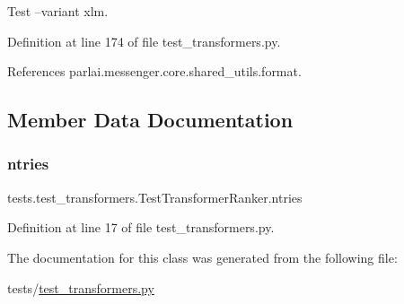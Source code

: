 \begin{DoxyVerb}Test --variant xlm.\end{DoxyVerb}
 

Definition at line 174 of file test\+\_\+transformers.\+py.



References parlai.\+messenger.\+core.\+shared\+\_\+utils.\+format.



\subsection{Member Data Documentation}
\mbox{\label{classtests_1_1test__transformers_1_1TestTransformerRanker_ac580716d99f1d6e925acdf3deee22def}} 
\subsubsection{\texorpdfstring{ntries}{ntries}}
{\footnotesize\ttfamily tests.\+test\+\_\+transformers.\+Test\+Transformer\+Ranker.\+ntries\hspace{0.3cm}{\ttfamily [static]}}



Definition at line 17 of file test\+\_\+transformers.\+py.



The documentation for this class was generated from the following file\+:\begin{DoxyCompactItemize}
\item 
tests/\hyperlink{test__transformers_8py}{test\+\_\+transformers.\+py}\end{DoxyCompactItemize}
